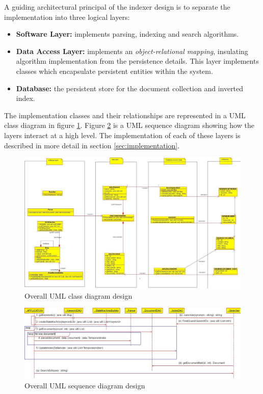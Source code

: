 \documentclass[10pt]{report}
\begin{document}
A guiding architectural principal of the indexer design is to separate the implementation
into three logical layers:
\begin{itemize}
\item \textbf{Software Layer:} implements parsing, indexing and search
  algorithms.
\item \textbf{Data Access Layer:} implements an
  \textit{object-relational mapping}, insulating algorithm
  implementation from the persistence details. This layer implements
  classes which encapsulate persistent entities within the system.
\item \textbf{Database:} the persistent store for the document
  collection and inverted index.
\end{itemize}

The implementation classes and their relationships are represented in
a UML class diagram in figure \ref{fig:overallclassdiagram}. Figure
\ref{fig:overallsequencediagram} is a UML sequence diagram showing how
the layers interact at a high level.  The implementation of each of
these layers is described in more detail in section
\ref{sec:implementation}.

\begin{figure}
  \begin{center}
	\includegraphics[width=\textwidth,height=!]{overallclassdiagram}
  \end{center}
  \caption{Overall UML class diagram design}
  \label{fig:overallclassdiagram}
\end{figure} 

\begin{figure}
  \begin{center}
	\includegraphics[width=\textwidth,height=!]{overallsequencediagram}
  \end{center}
  \caption{Overall UML sequence diagram design}
  \label{fig:overallsequencediagram}
\end{figure} 
\end{document}
